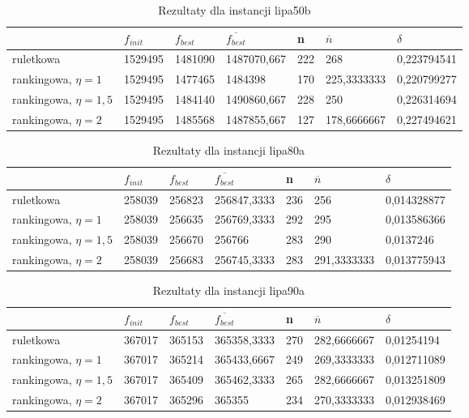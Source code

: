 \begin{table}[H]
\label{T5_lipa50b}
\begin{tabular}{l l l l l l l}
\hline
 & $f_{init}$ & $f_{best}$ & $\overline{f_{best}}$ & n & $\overline{n}$ & $\delta$ \\
\hline
ruletkowa & 1529495	 & 1481090 & 1487070,667 & 222 & 268 & 0,223794541\\
rankingowa, $\eta = 1$ & 1529495 & 1477465 & 1484398 & 170 & 225,3333333 & 0,220799277\\
rankingowa, $\eta = 1,5$ & 1529495 & 1484140 & 1490860,667 & 228 & 250 & 0,226314694\\
rankingowa, $\eta = 2$ & 1529495 & 1485568 & 1487855,667 & 127 & 178,6666667 & 0,227494621\\
\hline
\end{tabular}
\caption{Rezultaty dla instancji lipa50b}
\end{table}

\begin{table}[H]
\label{T5_lipa80a}
\begin{tabular}{l l l l l l l}
\hline
 & $f_{init}$ & $f_{best}$ & $\overline{f_{best}}$ & n & $\overline{n}$ & $\delta$ \\
\hline
ruletkowa & 258039 & 256823 & 256847,3333 & 236 & 256 & 0,014328877\\
rankingowa, $\eta = 1$ & 258039 & 256635 & 256769,3333 & 292 & 295 & 0,013586366\\
rankingowa, $\eta = 1,5$ & 258039 & 256670 & 256766 & 283 & 290 & 0,0137246\\
rankingowa, $\eta = 2$ & 258039 & 256683 & 256745,3333 & 283 & 291,3333333 & 0,013775943\\
\hline
\end{tabular}
\caption{Rezultaty dla instancji lipa80a}
\end{table}

\begin{table}[H]
\label{T5_lipa90a}
\begin{tabular}{l l l l l l l}
\hline
 & $f_{init}$ & $f_{best}$ & $\overline{f_{best}}$ & n & $\overline{n}$ & $\delta$ \\
\hline
ruletkowa & 367017 & 365153 & 365358,3333 & 270 & 282,6666667 & 0,01254194\\
rankingowa, $\eta = 1$ & 367017 & 365214 & 365433,6667 & 249 & 269,3333333 & 0,012711089\\
rankingowa, $\eta = 1,5$ & 367017 & 365409 & 365462,3333 & 265 & 282,6666667 & 0,013251809\\
rankingowa, $\eta = 2$ & 367017 & 365296 & 365355 & 234 & 270,3333333 & 0,012938469\\
\hline
\end{tabular}
\caption{Rezultaty dla instancji lipa90a}
\end{table}

